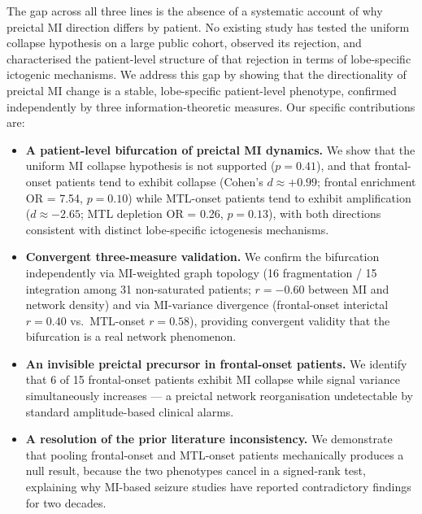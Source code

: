 \documentclass[final,5p,times,twocolumn]{elsarticle}
\begin{document}
The gap across all three lines is the absence of a systematic account
of why preictal MI direction differs by patient.
%
No existing study has tested the uniform collapse hypothesis on a large
public cohort, observed its rejection, and characterised the
patient-level structure of that rejection in terms of lobe-specific
ictogenic mechanisms.
%
We address this gap by showing that the directionality of preictal MI
change is a stable, lobe-specific patient-level phenotype, confirmed
independently by three information-theoretic measures.
%
Our specific contributions are:

\begin{itemize}
  \item \textbf{A patient-level bifurcation of preictal MI dynamics.}
        We show that the uniform MI collapse hypothesis is not supported
        ($p = 0.41$), and that frontal-onset patients tend to exhibit
        collapse (Cohen's $d \approx +0.99$; frontal enrichment
        OR = 7.54, $p = 0.10$) while MTL-onset patients tend to exhibit
        amplification ($d \approx -2.65$; MTL depletion OR = 0.26,
        $p = 0.13$), with both directions consistent with distinct
        lobe-specific ictogenesis mechanisms.

  \item \textbf{Convergent three-measure validation.}
        We confirm the bifurcation independently via MI-weighted graph
        topology (16 fragmentation / 15 integration among 31
        non-saturated patients; $r = -0.60$ between MI and network
        density) and via MI-variance divergence (frontal-onset
        interictal $r = 0.40$ vs.\ MTL-onset $r = 0.58$), providing
        convergent validity that the bifurcation is a real network
        phenomenon.

  \item \textbf{An invisible preictal precursor in frontal-onset
        patients.}
        We identify that 6 of 15 frontal-onset patients exhibit MI
        collapse while signal variance simultaneously increases ---
        a preictal network reorganisation undetectable by standard
        amplitude-based clinical alarms.

  \item \textbf{A resolution of the prior literature inconsistency.}
        We demonstrate that pooling frontal-onset and MTL-onset
        patients mechanically produces a null result, because the two
        phenotypes cancel in a signed-rank test, explaining why
        MI-based seizure studies have reported contradictory findings
        for two decades.
\end{itemize}
\end{document}
